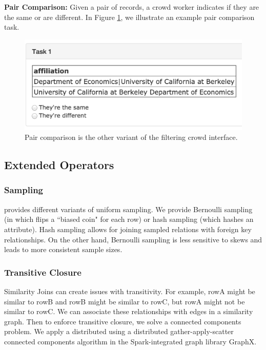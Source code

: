 \noindent\textbf{Pair Comparison: } Given a pair of records, a crowd worker indicates if they are the same or are different. In Figure \ref{fig:pair},
we illustrate an example pair comparison task.

\begin{figure}[ht!]
\centering
\includegraphics[scale=0.25]{figs/pair.png}
\caption{Pair comparison is the other variant of the filtering crowd interface.\label{fig:pair}}\vspace{-.5em}
\end{figure}



\subsection{Extended Operators}

\subsubsection{Sampling}
\projx provides different variants of uniform sampling.
We provide Bernoulli sampling (in which flips a ``biased coin" for each row) or hash sampling (which hashes an attribute).
Hash sampling allows for joining sampled relations with foreign key relationships.
On the other hand, Bernoulli sampling is less sensitive to skews and leads to more consistent sample sizes.

\subsubsection{Transitive Closure}
Similarity Joins can create issues with transitivity.
For example, rowA might be similar to rowB and rowB might be similar to rowC, but rowA might not be similar to rowC.
We can associate these relationships with edges in a similarity graph.
Then to enforce transitive closure, we solve a connected components problem.
We apply a distributed using a distributed gather-apply-scatter connected components algorithm in the Spark-integrated graph library GraphX.



